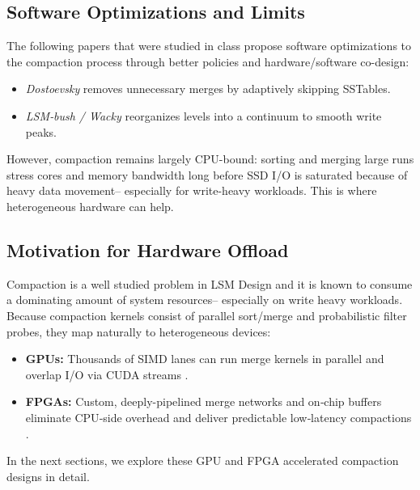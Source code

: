 \documentclass[sigconf]{acmart}
\begin{document}
      \subsection{Software Optimizations and Limits}
      The following papers that were studied in class propose software optimizations to the compaction process through better policies and hardware/software co-design:
      \begin{itemize}
        \item \emph{Dostoevsky} \cite{dayan2018dostoevsky} removes unnecessary merges by adaptively skipping SSTables.
        \item \emph{LSM‐bush / Wacky} \cite{dayan2019log} reorganizes levels into a continuum to smooth write peaks.
      \end{itemize}
      However, compaction remains largely CPU-bound: sorting and merging large runs stress cores and memory bandwidth long before SSD I/O is saturated because of heavy data movement-- especially for write-heavy workloads.  This is where heterogeneous hardware can help.

      \subsection{Motivation for Hardware Offload}
      Compaction is a well studied problem in LSM Design and it is known to consume a dominating amount of system resources-- especially on write heavy workloads.
      Because compaction kernels consist of parallel sort/merge and probabilistic filter probes, they map naturally to heterogeneous devices:
      \begin{itemize}
        \item \textbf{GPUs:} Thousands of SIMD lanes can run merge kernels in parallel and overlap I/O via CUDA streams \cite{ashkiani2018gpu, zhou2024gpuaccel}.
        \item \textbf{FPGAs:} Custom, deeply-pipelined merge networks and on‐chip buffers eliminate CPU‐side overhead and deliver predictable low‐latency compactions \cite{quraishi2025saf,zhang2020fpga}.
      \end{itemize}
      In the next sections, we explore these GPU and FPGA accelerated compaction designs in detail.
\end{document}
